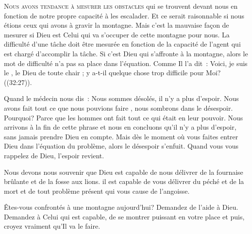 \lettrine{N}{ous avons tendance à mesurer les obstacles}
 qui se trouvent devant nous en fonction de notre propre capacité
 à les escalader. Et ce serait raisonnable si nous étions ceux qui avons
 à gravir la montagne. Mais c'est la mauvaise façon de mesurer
 si Dieu est Celui qui va s'occuper de cette montagne pour nous.
 La difficulté d'une tâche doit être mesurée en fonction de la capacité
 de l'agent qui est chargé d'accomplir la tâche.
 Si c'est Dieu qui s'affronte à la montagne, alors le mot
 de  \og difficulté \fg{}
 n'a pas sa place dans l'équation.
 Comme Il l'a dit~: 
 \og Voici, je suis le \Seigneur, le Dieu de toute chair ;
 y a-t-il quelque chose trop difficile pour Moi? \fg{}
 ((32:27)). 


Quand le médecin nous dis~: 
 \og Nous sommes désolés, il n'y a plus d'espoir.
 Nous avons fait tout ce que nous pouvions faire \fg{},
 nous sombrons dans le désespoir. Pourquoi?
 Parce que les hommes ont fait tout ce qui était en leur pouvoir.
 Nous arrivons à la fin de cette phrase et nous en concluons
 qu'il n'y a plus d'espoir, sans jamais prendre Dieu en compte.
 Mais dès  le moment où vous faites entrer Dieu
 dans l'équation du problème, alors le désespoir s'enfuit.
 Quand vous vous rappelez de Dieu, l'espoir revient. 

Nous devons nous souvenir que Dieu est capable de nous délivrer
 de la fournaise brûlante et de la fosse aux lions.
 il est capable de vous délivrer du péché et de la mort
 \ocadr et de tout problème présent qui vous cause de l'angoisse.

Êtes-vous confrontés à une montagne aujourd'hui? Demandez de l'aide à Dieu.
 Demandez à Celui qui est capable, de se montrer puissant en votre place
 \ocadr et puis, croyez vraiment qu'Il va le faire.

\dvrule






